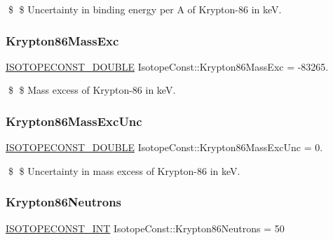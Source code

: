 \$ \$ Uncertainty in binding energy per A of Krypton-\/86 in keV. \mbox{\label{group___isotope_const-_krypton-_kr86_ga2432686ef01aa05410b2e8249952d22f}} 
\subsubsection{\texorpdfstring{Krypton86\+Mass\+Exc}{Krypton86MassExc}}
{\footnotesize\ttfamily \mbox{\hyperlink{group___isotope_const-_macros_ga8f45a7272ce02c0b4c65c44636ed719a}{I\+S\+O\+T\+O\+P\+E\+C\+O\+N\+S\+T\+\_\+\+D\+O\+U\+B\+LE}} Isotope\+Const\+::\+Krypton86\+Mass\+Exc = -\/83265.}

\$ \$ Mass excess of Krypton-\/86 in keV. \mbox{\label{group___isotope_const-_krypton-_kr86_ga62b5541b22a2801b110625702c606f5a}} 
\subsubsection{\texorpdfstring{Krypton86\+Mass\+Exc\+Unc}{Krypton86MassExcUnc}}
{\footnotesize\ttfamily \mbox{\hyperlink{group___isotope_const-_macros_ga8f45a7272ce02c0b4c65c44636ed719a}{I\+S\+O\+T\+O\+P\+E\+C\+O\+N\+S\+T\+\_\+\+D\+O\+U\+B\+LE}} Isotope\+Const\+::\+Krypton86\+Mass\+Exc\+Unc = 0.}

\$ \$ Uncertainty in mass excess of Krypton-\/86 in keV. \mbox{\label{group___isotope_const-_krypton-_kr86_ga2fcc24f8d59d3bc91dc3fd57daa8dc32}} 
\subsubsection{\texorpdfstring{Krypton86\+Neutrons}{Krypton86Neutrons}}
{\footnotesize\ttfamily \mbox{\hyperlink{group___isotope_const-_macros_ga5f18360b3e99483a35c32d789e62621c}{I\+S\+O\+T\+O\+P\+E\+C\+O\+N\+S\+T\+\_\+\+I\+NT}} Isotope\+Const\+::\+Krypton86\+Neutrons = 50}

